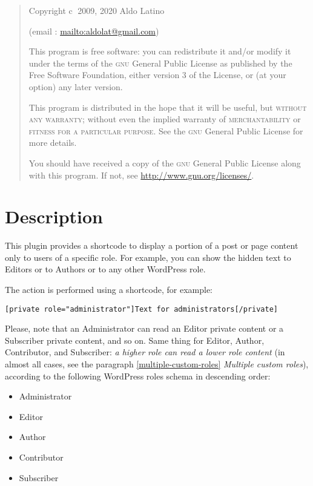 \documentclass[
	titlepage,
	headinclude,
	abstract=on,
	paper=a4,
	fontsize=11pt,
]{scrartcl}
\begin{document}
\begin{quote}
  \small
  \begin{center}
    Copyright \textcircled{c} 2009, 2020  Aldo Latino

    (email : \url{mailto:aldolat@gmail.com})
  \end{center}
This program is free software: you can redistribute it and/or modify
it under the terms of the \textsc{gnu} General Public License as published by
the Free Software Foundation, either version 3 of the License, or
(at your option) any later version.

This program is distributed in the hope that it will be useful,
but \textsc{without any warranty}; without even the implied warranty of
\textsc{merchantability} or \textsc{fitness for a particular purpose}.  See the
\textsc{gnu} General Public License for more details.

You should have received a copy of the \textsc{gnu} General Public License
along with this program. If not, see \url{http://www.gnu.org/licenses/}.
\end{quote}

\section{Description}

This plugin provides a shortcode to display a portion of a post or page content only to users of a specific role. For example, you can show the hidden text to Editors or to Authors or to any other WordPress role.

The action is performed using a shortcode, for example:

\begin{lstlisting}
[private role="administrator"]Text for administrators[/private]
\end{lstlisting}

Please, note that an Administrator can read an Editor private content or a Subscriber private content, and so on. Same thing for Editor, Author, Contributor, and Subscriber: \textit{a higher role can read a lower role content} (in almost all cases, see the paragraph \ref{multiple-custom-roles} \textit{Multiple custom roles}), according to the following WordPress roles schema in descending order:

\begin{itemize}
 \item Administrator
 \item Editor
 \item Author
 \item Contributor
 \item Subscriber
\end{itemize}
\end{document}

